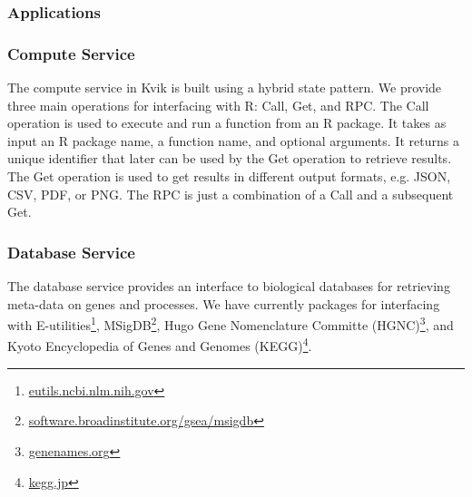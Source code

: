 \subsubsection*{Applications}


\subsubsection*{Compute Service}
The compute service in Kvik is built using a hybrid state pattern\cite{opencpu}.
We provide three main operations for interfacing with R:
Call, Get, and RPC. The Call operation is used to execute and run a function
from an R package. 
It takes as input an R package name, a function name, and
optional arguments. It returns a unique identifier that later can be used by the
Get operation to retrieve results. The Get operation is used to get results in
different output formats, e.g. JSON, CSV, PDF, or PNG. The RPC is just a
combination of a Call and a subsequent Get. 




\subsubsection*{Database Service} 
The database service provides an interface to biological databases for
retrieving meta-data on genes and processes. 
We have currently packages for
interfacing with
E-utilities\footnote{\url{eutils.ncbi.nlm.nih.gov}},
MSigDB\footnote{\url{software.broadinstitute.org/gsea/msigdb}}, Hugo Gene
Nomenclature Committe (HGNC)\footnote{\url{genenames.org}}, and Kyoto Encyclopedia
of Genes and Genomes (KEGG)\footnote{\url{kegg.jp}}. 

